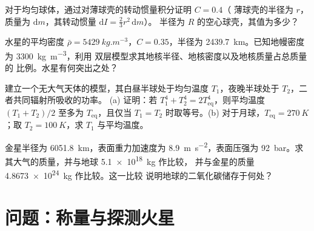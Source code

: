 \begin{exercise}[$\star\star$]\label{exo:b1:comparative-planetology:9}
对于均匀球体，通过对薄球壳的转动惯量积分证明 $C = 0.4$（
薄球壳的半径为 $r$，质量为
$\mathrm dm$，其转动惯量 $\mathrm dI = \tfrac23 r^2\,\mathrm dm$）。
半径为 $R$ 的空心球壳，其值为多少？
\end{exercise}

\begin{exercise}[$\star\star\star$]\label{exo:b1:comparative-planetology:10}
水星的平均密度 $\bar\rho = \qty{5429}{kg.m^{-3}}$，$C = 0.35$，半径为
\qty{2439.7}{km}。已知地幔密度为 \qty{3300}{kg.m^{-3}}，利用
双层模型求其地核半径、地核密度以及地核质量占总质量的
比例。水星有何突出之处？
\end{exercise}

\begin{exercise}[$\star\star\star$]\label{exo:b1:comparative-planetology:11}
建立一个无大气天体的模型，其白昼半球处于均匀温度
$T_1$，夜晚半球处于 $T_2$，二者共同辐射所吸收的功率。
(a) 证明：若 $T_1^4 + T_2^4 = 2T_\mathrm{eq}^4$，则平均温度
$(T_1 + T_2)/2$ 至多为 $T_\mathrm{eq}$，且仅当
$T_1 = T_2$ 时取等号。(b) 对于月球，$T_\mathrm{eq} = \qty{270}{K}$；取
$T_2 = \qty{100}{K}$，求 $T_1$ 与平均温度。
\end{exercise}

\begin{exercise}[$\star\star\star$]\label{exo:b1:comparative-planetology:12}
金星半径为 \qty{6051.8}{km}，表面重力加速度为
\qty{8.9}{m.s^{-2}}，表面压强为 \qty{92}{bar}。求
其大气的质量，并与地球 \qty{5.1e18}{kg} 作比较，
并与金星的质量 \qty{4.8673e24}{kg} 作比较。这一比较
说明地球的二氧化碳储存于何处？
\end{exercise}

\section{问题：称量与探测火星}

